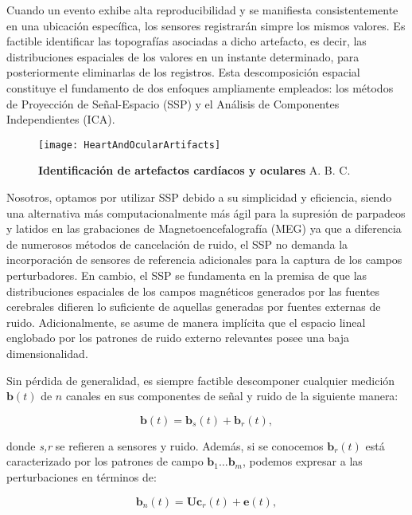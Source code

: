 \documentclass[11pt,letterpaper]{article}
\numberwithin{equation}{subsection}
\numberwithin{table}{subsection}
\begin{document}
\bigskip 
\noindent Cuando un evento exhibe alta reproducibilidad y se manifiesta consistentemente en una ubicación específica, los sensores registrarán simpre los mismos valores. Es factible identificar las topografías asociadas a dicho artefacto, es decir, las distribuciones espaciales de los valores en un instante determinado, para posteriormente eliminarlas de los registros. Esta descomposición espacial constituye el fundamento de dos enfoques ampliamente empleados: los métodos de Proyección de Señal-Espacio (SSP) y el Análisis de Componentes Independientes (ICA).

\begin{figure}[H]
\centering
	\texttt{[image: HeartAndOcularArtifacts]}
	\captionsetup{labelfont=bf}
	\caption{\scriptsize \textbf{Identificación de artefactos cardíacos y oculares} A. B. C.}
	\label{fig:Fig15}
\end{figure}


\bigskip 
\noindent Nosotros, optamos por utilizar SSP debido a su simplicidad y eficiencia, siendo una alternativa más computacionalmente más ágil para la supresión de parpadeos y latidos en las grabaciones de Magnetoencefalografía (MEG) ya que a diferencia de numerosos métodos de cancelación de ruido, el  SSP no demanda la incorporación de sensores de referencia adicionales para la captura de los campos perturbadores. En cambio, el SSP se fundamenta en la premisa de que las distribuciones espaciales de los campos magnéticos generados por las fuentes cerebrales difieren lo suficiente de aquellas generadas por fuentes externas de ruido. Adicionalmente, se asume de manera implícita que el espacio lineal englobado por los patrones de ruido externo relevantes posee una baja dimensionalidad.

\bigskip
\noindent Sin pérdida de generalidad, es siempre factible descomponer cualquier medición $\mathbf{b}(t)$ de $n$ canales en sus componentes de señal y ruido de la siguiente manera:

\begin{equation}
\textbf{b}(t) = \textbf{b}_s(t) + \textbf{b}_r(t),
\end{equation}

\noindent donde \textit{s,r} se refieren a sensores y ruido. Además, si se conocemos $\textbf{b}_r(t)$ está caracterizado por los patrones de campo $\textbf{b}_1 \ldots \textbf{b}_m$, podemos expresar a las perturbaciones en términos de:

\begin{equation}
\textbf{b}_n(t) = \textbf{Uc}_r(t)+\textbf{e}(t),
\end{equation}
\end{document}
